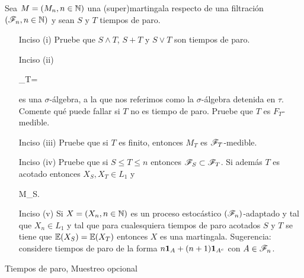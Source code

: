 \begin{problema}
	Sea ${M=\left( M_n,n\in\mathbb{N}\right) }$ una (super)martingala respecto de una filtraci\'on ${\left( \mathscr{F}_n,n\in\mathbb{N}\right) }$ y sean ${S}$ y ${T}$ tiempos de paro.
	
\begin{enumerate}
                \item[Inciso (i)] 
                	Pruebe que ${S\wedge T}$, ${S+T}$ y ${S\vee T}$ son tiempos de paro.
                
                \item[Inciso (ii)] 
                	\begin{esn}
                		\F_T=
                	\end{esn}
                	es una ${\sigma}$-\'algebra, a la que nos referimos como la ${\sigma}$-\'algebra 
                	detenida en ${\tau}$. Comente qu\'e puede fallar si ${T}$ no es tiempo de paro. 
                	Pruebe que ${T}$ es ${F_T}$-medible. 
                
                \item[Inciso (iii)] 
                	Pruebe que si ${T}$ es finito, entonces ${M_T}$ es ${\mathscr{F}_T}$-medible.
                
                \item[Inciso (iv)] 
                	Pruebe que si ${S\leq T\leq n}$ entonces ${\mathscr{F}_S\subset\mathscr{F}_T}$. Si adem\'as ${T}$ es acotado entonces ${X_S,X_T\in L_1}$ y 
                	\begin{esn}
	                	\leq M_S.
                	\end{esn}

                \item[Inciso (v)] 
                	Si ${X=\left( X_n,n\in\mathbb{N}\right) }$ es un proceso estoc\'astico ${\left( \mathscr{F}_n\right) }$-adaptado y tal que ${X_n\in L_1}$ y tal que 
                	para cualesquiera tiempos de paro acotados ${S}$ y ${T}$ se tiene que ${\mathbb{E}\! \left( X_S \right)=\mathbb{E}\! \left( X_T \right)}$ entonces ${X}$ es una 
                	martingala. Sugerencia: considere tiempos de paro de la forma ${n{\bf{1}}_{A}+(n+1){\bf{1}}_{A^c}}$ con ${A\in\mathscr{F}_n}$.
\end{enumerate}

Tiempos de paro, Muestreo opcional
\end{problema}

